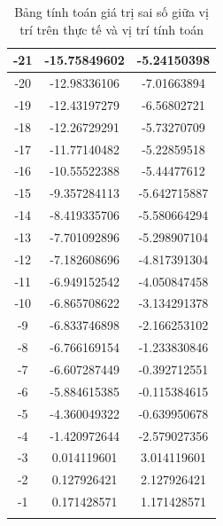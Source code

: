 \begin{longtable}{|c|c|c|}
                \hline
                -21 & -15.75849602 & -5.24150398 \\
                \hline
                -20 & -12.98336106 & -7.01663894 \\
                \hline
                -19 & -12.43197279 & -6.56802721 \\
                \hline
                -18 & -12.26729291 & -5.73270709 \\
                \hline
                -17 & -11.77140482 & -5.22859518 \\
                \hline
                -16 & -10.55522388 & -5.44477612 \\
                \hline
                -15 & -9.357284113 & -5.642715887 \\
                \hline
                -14 & -8.419335706 & -5.580664294 \\
                \hline
                -13 & -7.701092896 & -5.298907104 \\
                \hline
                -12 & -7.182608696 & -4.817391304 \\
                \hline
                -11 & -6.949152542 & -4.050847458 \\
                \hline
                -10 & -6.865708622 & -3.134291378 \\
                \hline
                -9 & -6.833746898 & -2.166253102 \\
                \hline
                -8 & -6.766169154 & -1.233830846 \\
                \hline
                -7 & -6.607287449 & -0.392712551 \\
                \hline
                -6 & -5.884615385 & -0.115384615 \\
                \hline
                -5 & -4.360049322 & -0.639950678 \\
                \hline
                -4 & -1.420972644 & -2.579027356 \\
                \hline
                -3 & 0.014119601 & 3.014119601 \\
                \hline
                -2 & 0.127926421 & 2.127926421 \\
                \hline
                -1 & 0.171428571 & 1.171428571 \\
                \hline        
                \caption{Bảng tính toán giá trị sai số giữa vị trí trên thực tế và vị trí tính toán}
                \label{tab:4-4}
            \end{longtable}

